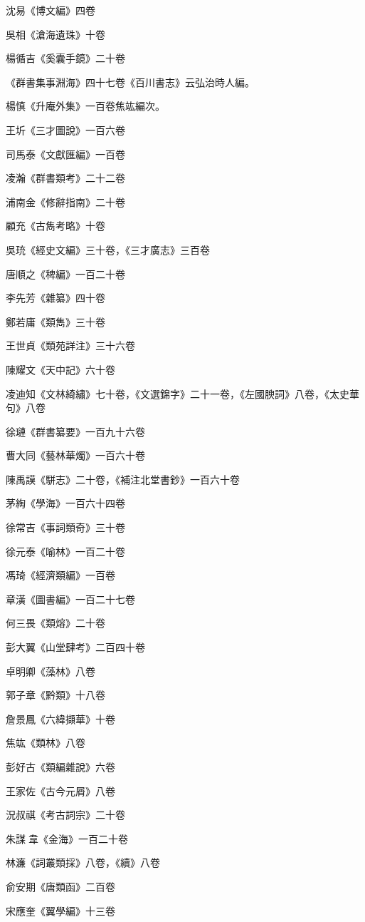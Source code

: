 沈易《博文編》四卷

吳相《滄海遺珠》十卷

楊循吉《奚囊手鏡》二十卷

《群書集事淵海》四十七卷《百川書志》云弘治時人編。

楊慎《升庵外集》一百卷焦竑編次。

王圻《三才圖說》一百六卷

司馬泰《文獻匯編》一百卷

凌瀚《群書類考》二十二卷

浦南金《修辭指南》二十卷

顧充《古雋考略》十卷

吳珫《經史文編》三十卷，《三才廣志》三百卷

唐順之《稗編》一百二十卷

李先芳《雜纂》四十卷

鄭若庸《類雋》三十卷

王世貞《類苑詳注》三十六卷

陳耀文《天中記》六十卷

凌迪知《文林綺繡》七十卷，《文選錦字》二十一卷，《左國腴詞》八卷，《太史華句》八卷

徐璉《群書纂要》一百九十六卷

曹大同《藝林華燭》一百六十卷

陳禹謨《駢志》二十卷，《補注北堂書鈔》一百六十卷

茅綯《學海》一百六十四卷

徐常吉《事詞類奇》三十卷

徐元泰《喻林》一百二十卷

馮琦《經濟類編》一百卷

章潢《圖書編》一百二十七卷

何三畏《類熔》二十卷

彭大翼《山堂肆考》二百四十卷

卓明卿《藻林》八卷

郭子章《黔類》十八卷

詹景鳳《六緯擷華》十卷

焦竑《類林》八卷

彭好古《類編雜說》六卷

王家佐《古今元屑》八卷

況叔祺《考古詞宗》二十卷

朱謀韋《金海》一百二十卷

林濂《詞叢類採》八卷，《續》八卷

俞安期《唐類函》二百卷

宋應奎《翼學編》十三卷

